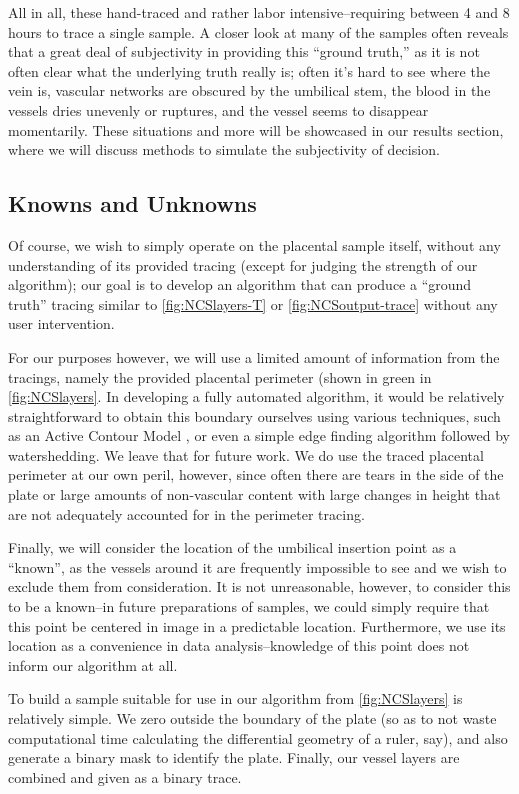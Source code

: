 All in all, these hand-traced and rather labor intensive--requiring between 4 and 8 hours to trace a single sample. A closer look at many of the samples often reveals that a great deal of subjectivity in providing this ``ground truth,'' as it is not often clear what the underlying truth really is; often it's hard to see where the vein is, vascular networks are obscured by the umbilical stem, the blood in the vessels dries unevenly or ruptures, and the vessel seems to disappear momentarily. These situations and more will be showcased in our results section, where we will discuss methods to simulate the subjectivity of decision.


\subsection{Knowns and Unknowns}
Of course, we wish to simply operate on the placental sample itself, without any understanding of its provided tracing (except for judging the strength of our algorithm);
our goal is to develop an algorithm that can produce a ``ground truth'' tracing similar to \cref{fig:NCSlayers-T} or \cref{fig:NCSoutput-trace} without any user intervention.

For our purposes however, we will use a limited amount of information from the tracings, namely the provided placental perimeter (shown in green in \cref{fig:NCSlayers}. In developing a fully automated algorithm, it would be relatively straightforward to obtain this boundary ourselves using various techniques, such as an Active Contour Model \cite{activecontours}, or even a simple edge finding algorithm followed by watershedding. We leave that for future work. We do use the traced placental perimeter at our own peril, however, since often there are tears in the side of the plate or large amounts of non-vascular content with large changes in height that are not adequately accounted for in the perimeter tracing.

Finally, we will consider the location of the umbilical insertion point as a ``known'', as the vessels around it are frequently impossible to see and we wish to exclude them from consideration. It is not unreasonable, however, to consider this to be a known--in future preparations of samples, we could simply require that this point be centered in image in a predictable location. Furthermore, we use its location as a convenience in data analysis--knowledge of this point does not inform our algorithm at all.


To build a sample suitable for use in our algorithm from \cref{fig:NCSlayers} is relatively simple. We  zero  outside the boundary of the plate (so as to not waste computational time calculating the differential geometry of a ruler, say), and also generate a binary mask to identify the plate. Finally, our vessel layers are combined and given as a binary trace.

